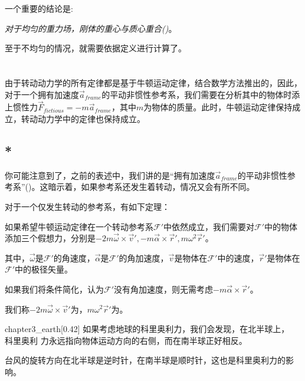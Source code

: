 一个重要的结论是:
\begin{center}
	{\itshape 对于均匀的重力场，刚体的重心与质心重合()}。
\end{center}

至于不均匀的情况，就需要依据定义进行计算了。
\section[非惯性系情形]{}
\subsection[非惯性力]{}
由于转动动力学的所有定律都是基于牛顿运动定律，结合数学方法推出的，因此，对于一个拥有加速度$\vec{a}_{frame}$的平动非惯性参考系，我们需要在分析其中的物体时添上惯性力$\vec{F}_{fictious}=-m\vec{a}_{frame}$，其中$m$为物体的质量。此时，牛顿运动定律保持成立，转动动力学中的定律也保持成立。

\subsection[科里奥利力*]{*}
你可能注意到了，之前的表述中，我们讲的是“拥有加速度$\vec{a}_{frame}$的平动非惯性参考系”()。这暗示着，如果参考系还发生着转动，情况又会有所不同。

对于一个仅发生转动的参考系，有如下定理：
\begin{law}
	如果希望牛顿运动定律在一个转动参考系$\mathcal{F}'$中依然成立，我们需要对$\mathcal{F}'$中的物体添加三个假想力，分别是$-2m\vec{\omega}\times\vec{v}',-m\vec{\alpha}\times\vec{r}',m\omega^2\vec{r}'$。
	
	其中，$\vec{\omega}$是$\mathcal{F}'$的角速度，$\vec{\alpha}$是$\mathcal{F}'$的角加速度，$\vec{v}$是物体在$\mathcal{F}'$中的速度，$\vec{r}'$是物体在$\mathcal{F}'$中的极径矢量。
	
	如果我们将条件简化，认为$\mathcal{F}'$没有角加速度，则无需考虑$-m\vec{\alpha}\times\vec{r}'$。
	
	我们称$-2m\vec{\omega}\times\vec{v}'$为，$m\omega^2\vec{r}'$为。
\end{law}
\begin{singlefigure}[地球的科里奥利力]{chapter3_earth}[0.42]
如果考虑地球的科里奥利力，我们会发现，在北半球上，\\科里奥利
力永远指向物体运动方向的右侧，而在南半球正好相反。
\end{singlefigure}
台风的旋转方向在北半球是逆时针，在南半球是顺时针，这也是科里奥利力的影响。

